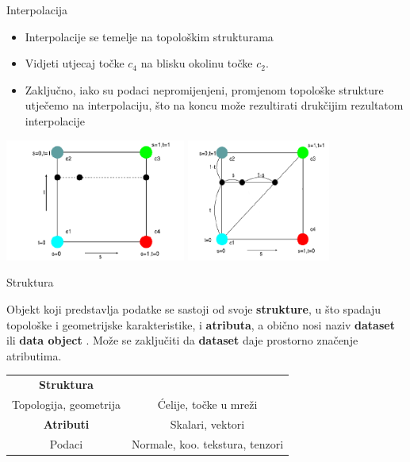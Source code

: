 \documentclass[9pt]{beamer}
\begin{document}
\begin{frame}{Interpolacija}
	\begin{itemize}
		\item Interpolacije se temelje na topološkim strukturama
		\item Vidjeti utjecaj točke $c_{4}$ na blisku okolinu točke $c_{2}$.
		\item Zaključno, iako su podaci nepromijenjeni, promjenom topološke strukture utječemo na interpolaciju, što na koncu može rezultirati drukčijim rezultatom interpolacije
	\end{itemize}
	\begin{center}
		\includegraphics[height=4cm]{slike/interp_quad_no_formula.png}
		\includegraphics[height=4cm]{slike/interp_quad_tri_no_formula.png}
	\end{center}
\end{frame}
\begin{frame}{Struktura}
	
	\begin{block}{}
		Objekt koji predstavlja podatke se sastoji od svoje \textbf{strukture}, u što spadaju topološke i geometrijske karakteristike, i \textbf{atributa}, a obično nosi naziv \textbf{dataset} ili \textbf{data object} . Može se zaključiti da \textbf{dataset} daje prostorno značenje atributima.
	\end{block}

		\begin{center}
			\begin{tabular}{cc}\hline
				\textbf{Struktura}   &\\
				Topologija, geometrija & Ćelije, točke u mreži\\\hline
				\textbf{Atributi} & Skalari, vektori\\
				Podaci & Normale, koo. tekstura, tenzori \\\hline
			\end{tabular}
		\end{center}

\end{frame}
\end{document}
